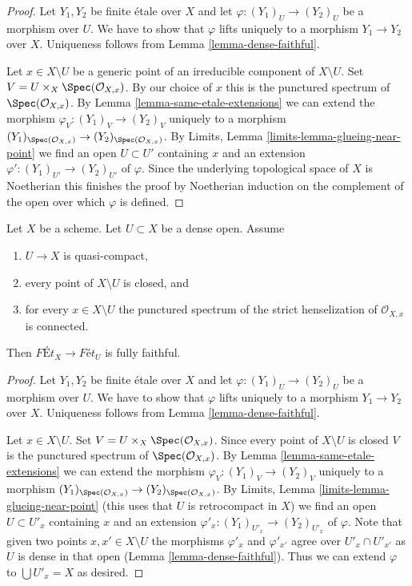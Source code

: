 \begin{proof}
Let $Y_1, Y_2$ be finite \'etale over $X$ and let
$\varphi : (Y_1)_U \to (Y_2)_U$ be a morphism over $U$. We have to show that
$\varphi$ lifts uniquely to a morphism $Y_1 \to Y_2$ over $X$.
Uniqueness follows from Lemma \ref{lemma-dense-faithful}.

\medskip\noindent
Let $x \in X \setminus U$ be a generic point of an irreducible component
of $X \setminus U$. Set $V = U \times_X \Spec(\mathcal{O}_{X, x})$.
By our choice of $x$ this is the punctured spectrum of
$\Spec(\mathcal{O}_{X, x})$. By
Lemma \ref{lemma-same-etale-extensions}
we can extend the morphism $\varphi_V : (Y_1)_V \to (Y_2)_V$
uniquely to a morphism
$(Y_1)_{\Spec(\mathcal{O}_{X, x})} \to (Y_2)_{\Spec(\mathcal{O}_{X, x})}$.
By Limits, Lemma \ref{limits-lemma-glueing-near-point}
we find an open $U \subset U'$ containing $x$ and an extension
$\varphi' : (Y_1)_{U'} \to (Y_2)_{U'}$ of $\varphi$.
Since the underlying topological space of $X$ is Noetherian
this finishes the proof by Noetherian induction on the complement
of the open over which $\varphi$ is defined.
\end{proof}

\begin{lemma}
\label{lemma-retrocompact-dense-open-connected-at-infinity-closed}
Let $X$ be a scheme. Let $U \subset X$ be a dense open. Assume
\begin{enumerate}
\item $U \to X$ is quasi-compact,
\item every point of $X \setminus U$ is closed, and
\item for every $x \in X \setminus U$ the punctured spectrum of the
strict henselization of $\mathcal{O}_{X, x}$ is connected.
\end{enumerate}
Then $\textit{F\'Et}_X \to \textit{F\'et}_U$ is fully faithful.
\end{lemma}

\begin{proof}
Let $Y_1, Y_2$ be finite \'etale over $X$ and let
$\varphi : (Y_1)_U \to (Y_2)_U$ be a morphism over $U$. We have to show that
$\varphi$ lifts uniquely to a morphism $Y_1 \to Y_2$ over $X$.
Uniqueness follows from Lemma \ref{lemma-dense-faithful}.

\medskip\noindent
Let $x \in X \setminus U$. Set $V = U \times_X \Spec(\mathcal{O}_{X, x})$.
Since every point of $X \setminus U$ is closed $V$ is the punctured spectrum
of $\Spec(\mathcal{O}_{X, x})$. By
Lemma \ref{lemma-same-etale-extensions}
we can extend the morphism $\varphi_V : (Y_1)_V \to (Y_2)_V$
uniquely to a morphism
$(Y_1)_{\Spec(\mathcal{O}_{X, x})} \to (Y_2)_{\Spec(\mathcal{O}_{X, x})}$.
By Limits, Lemma \ref{limits-lemma-glueing-near-point}
(this uses that $U$ is retrocompact in $X$)
we find an open $U \subset U'_x$ containing $x$ and an extension
$\varphi'_x : (Y_1)_{U'_x} \to (Y_2)_{U'_x}$ of $\varphi$.
Note that given two points $x, x' \in X \setminus U$ the
morphisms $\varphi'_x$ and $\varphi'_{x'}$ agree over
$U'_x \cap U'_{x'}$ as $U$ is dense in that open
(Lemma \ref{lemma-dense-faithful}). Thus we can extend $\varphi$
to $\bigcup U'_x = X$ as desired.
\end{proof}

